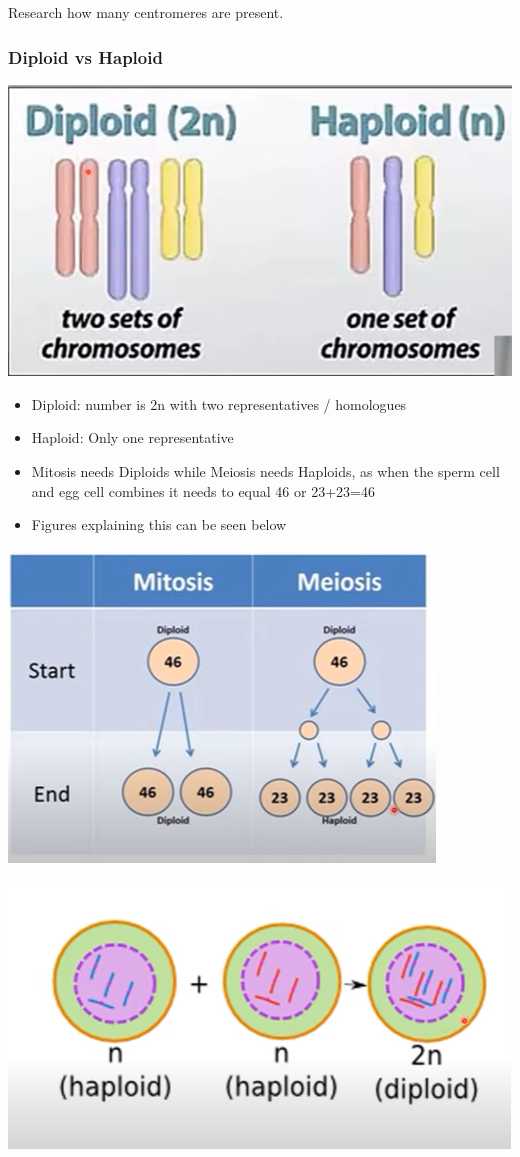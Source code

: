 \documentclass{article}
\begin{document}
Research how many centromeres are present.

\subsubsection*{Diploid vs Haploid}
\includegraphics[scale=0.5]{DipVsHap.png}
\begin{itemize}
    \item Diploid: number is 2n with two representatives / homologues
    \item Haploid: Only one representative
    \item Mitosis needs Diploids while Meiosis needs Haploids, as when the  sperm cell and egg cell combines it needs to equal 46 or 23+23=46
    \item Figures explaining this can be seen below
\end{itemize}
\includegraphics[scale=0.6]{MitMeoDipHap.png}


\includegraphics[scale=0.5]{nn2n.png}
\end{document}
